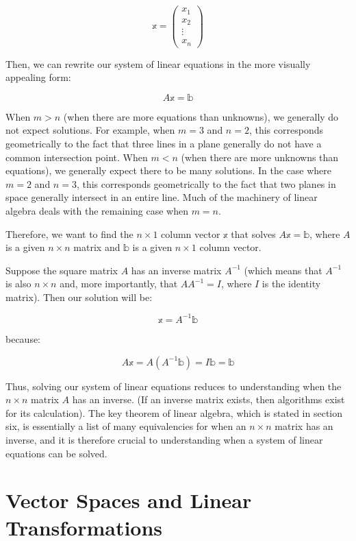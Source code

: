 \documentclass[
]{book}
\theoremstyle{definition}
\theoremstyle{definition}
\theoremstyle{definition}
\theoremstyle{definition}
\theoremstyle{remark}
\begin{document}
\[
\mathbb{x} = \begin{pmatrix} x_1 \\ x_2 \\ \vdots \\ x_n \end{pmatrix}
\]

Then, we can rewrite our system of linear equations in the more visually appealing form:

\[
A \mathbb{x} = \mathbb{b}
\]

When \(m > n\) (when there are more equations than unknowns), we generally do not expect solutions. For example, when \(m = 3\) and \(n = 2\), this corresponds geometrically to the fact that three lines in a plane generally do not have a common intersection point. When \(m < n\) (when there are more unknowns than equations), we generally expect there to be many solutions. In the case where \(m = 2\) and \(n = 3\), this corresponds geometrically to the fact that two planes in space generally intersect in an entire line. Much of the machinery of linear algebra deals with the remaining case when \(m = n\).

Therefore, we want to find the \(n \times 1\) column vector \(\mathbb{x}\) that solves \(A \mathbb{x} = \mathbb{b}\), where \(A\) is a given \(n \times n\) matrix and \(\mathbb{b}\) is a given \(n \times 1\) column vector.

Suppose the square matrix \(A\) has an inverse matrix \(A^{-1}\) (which means that \(A^{-1}\) is also \(n \times n\) and, more importantly, that \(A A^{-1} = I\), where \(I\) is the identity matrix). Then our solution will be:

\[
\mathbb{x} = A^{-1} \mathbb{b}
\]

because:

\[
A \mathbb{x} = A (A^{-1} \mathbb{b}) = I \mathbb{b} = \mathbb{b}
\]

Thus, solving our system of linear equations reduces to understanding when the \(n \times n\) matrix \(A\) has an inverse. (If an inverse matrix exists, then algorithms exist for its calculation). The key theorem of linear algebra, which is stated in section six, is essentially a list of many equivalencies for when an \(n \times n\) matrix has an inverse, and it is therefore crucial to understanding when a system of linear equations can be solved.

\hypertarget{vector-spaces-and-linear-transformations}{%
\section{Vector Spaces and Linear Transformations}\label{vector-spaces-and-linear-transformations}}
\end{document}
